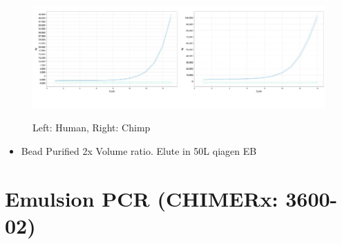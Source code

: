 \documentclass[a4paper]{article}
\begin{document}
        	\begin{figure}[H]
				\centering
				\includegraphics[width=1.0\textwidth]{2016_04_21_Scaled_LibAmp.jpg}
				\label{fig:Scaled qPCR Library Amplification}
				\caption{Left: Human, Right: Chimp}
		
        	\end{figure}
        \begin{itemize}
        
        \item Bead Purified 2x Volume ratio. Elute in 50\textmu L qiagen EB
        
        \end{itemize}
        
\section{Emulsion PCR (CHIMERx: 3600-02)} 
\end{document}
